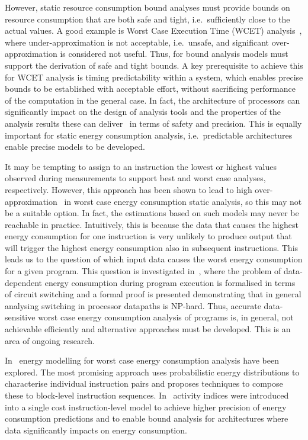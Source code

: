 However, static resource consumption bound analyses must provide bounds on
resource consumption that are both safe and tight, i.e.\ sufficiently close to
the actual values. A good example is Worst Case Execution Time (WCET)
analysis~\cite{DBLP:journals/tecs/WilhelmEEHTWBFHMMPPSS08}, where
under-approximation is not acceptable, i.e.\ unsafe, and significant
over-approximation is considered not useful.
%
Thus, for bound analysis models must support the derivation of safe and tight
bounds. 
%
A key prerequisite to achieve this for WCET analysis is timing predictability
within a system, which enables precise bounds to be established with acceptable
effort, without sacrificing performance of the computation in the general case.
In fact, the architecture of processors can significantly impact on the design
of analysis tools and the properties of the analysis results these can
deliver~\cite{influence-wilhelm-2003} in terms of safety and precision. This is
equally important for static energy consumption analysis, i.e.\ predictable
architectures enable precise models to be developed.

It may be tempting to assign to an instruction the lowest or highest values
observed during measurements to support best and worst case analyses,
respectively. However, this approach has been shown to lead to high
over-approximation~\cite{Wagemann-2015-WCEC} in worst case energy consumption
static analysis, so this may not be a suitable option.
%
In fact, the estimations based on such models may never be reachable in
practice. Intuitively, this is because the data that causes the highest energy
consumption for one instruction is very unlikely to produce output that will
trigger the highest energy consumption also in subsequent instructions. 
%
This leads us to the question of which input data causes the worst energy
consumption for a given program. This question is investigated
in~\cite{2016arXiv160302580M}, where the problem of data-dependent energy
consumption during program execution is formalised in terms of circuit
switching and a formal proof is presented demonstrating that in general
analysing switching in processor datapaths is NP-hard. Thus, accurate
data-sensitive worst case energy consumption analysis of programs is, in
general, not achievable efficiently and alternative approaches must be
developed. This is an area of ongoing research.

In~\cite{pallister2015data} energy modelling for worst case energy consumption
analysis have been explored. The most promising approach uses probabilistic
energy distributions to characterise individual instruction pairs and proposes
techniques to compose these to block-level instruction sequences.
%
In~\cite{highdatadep} activity indices were introduced into a single cost
instruction-level model to achieve higher precision of energy consumption
predictions and to enable bound analysis for architectures where data
significantly impacts on energy consumption.



